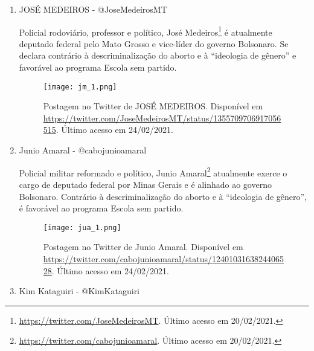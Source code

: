 \documentclass[
	12pt,				%
	openright,			%
	twoside,			%
	a4paper,			%
	english,			%
	brazil				%
	]{abntex2}
\begin{document}
\begin{anexosenv}
\begin{enumerate}
 \item JOSÉ MEDEIROS - @JoseMedeirosMT
 
 Policial rodoviário, professor e político, José Medeiros\footnote{\url{https://twitter.com/JoseMedeirosMT}. Último acesso em 20/02/2021.} é atualmente deputado federal pelo Mato Grosso e vice-líder do governo Bolsonaro. Se declara contrário à descriminalização do aborto e à ``ideologia de gênero'' e favorável ao programa Escola sem partido.
 
 \begin{figure}[!htbp]
    \centering
    \texttt{[image: jm\_1.png]}
    \caption{Postagem no Twitter de JOSÉ MEDEIROS. Disponível em \url{https://twitter.com/JoseMedeirosMT/status/1355709706917056515}. Último acesso em 24/02/2021.}
 \end{figure}
 
 
  \item Junio Amaral - @cabojunioamaral
  
  Policial militar reformado e político, Junio Amaral\footnote{\url{https://twitter.com/cabojunioamaral}. Último acesso em 20/02/2021.} atualmente exerce o cargo de deputado federal por Minas Gerais e é alinhado ao governo Bolsonaro. Contrário à descriminalização do aborto e à ``ideologia de gênero'', é favorável ao programa Escola sem partido.
 
 \begin{figure}[!htbp]
    \centering
    \texttt{[image: jua\_1.png]}
    \caption{Postagem no Twitter de Junio Amaral. Disponível em \url{https://twitter.com/cabojunioamaral/status/1240103163824406528}. Último acesso em 24/02/2021.}
 \end{figure}
 
  
 \item Kim Kataguiri - @KimKataguiri
 

\end{enumerate}
\end{anexosenv}
\end{document}

